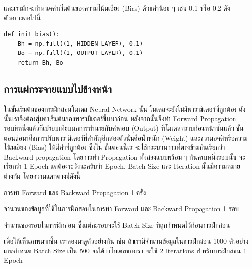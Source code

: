 \noindent และเรามักจะกำหนดค่าเริ่มต้นของความโน้มเอียง (Bias) ด้วยค่าน้อย ๆ เช่น 0.1 หรือ 0.2 ดังตัวอย่างต่อไปนี้

\begin{lstlisting}[style=MyPython]
def init_bias():
    Bh = np.full((1, HIDDEN_LAYER), 0.1)
    Bo = np.full((1, OUTPUT_LAYER), 0.1)
    return Bh, Bo
\end{lstlisting}

\subsection{การแผ่กระจายแบบไปข้างหน้า}
\label{ssec:forward_prop}

ในขั้นเริ่มต้นของการฝึกสอนโมเดล Neural Network นั้น โมเดลจะยังไม่มีพารามิเตอร์ที่ถูกต้อง ดังนั้นเราจึงต้องสุ่มค่าเริ่มต้นของพารามิเตอร์ขึ้นมาก่อน
หลังจากนั้นจึงทำ Forward Propagation รอบที่หนึ่งแล้วก็เปรียบเทียบผลการทำนายกับคำตอบ (Output) ที่โมเดลทราบก่อนหน้านั้นแล้ว
ขั้นตอนต่อมาคือการปรับพารามิเตอร์ที่สำคัญอีกสองตัวนั่นคือน้ำหนัก (Weight) และความอคติหรือความโน้มเอียง (Bias) ให้มีค่าที่ถูกต้อง ซึ่งใน%
ขั้นตอนนี้เราจะใช้กระบวนการที่ตรงข้ามกันเรียกว่า Backward propagation โดยการทำ Propagation ทั้งสองแบบพร้อม ๆ กันครบหนึ่งรอบนั้น%
จะเรียกว่า 1 Epoch แต่ต้องระวังนะครับว่า Epoch, Batch Size และ Iteration นั้นมีความหมายต่างกัน โดยความแตกตางมีดังนี้

\begin{description}[font=$\bullet$~\normalfont\scshape\bfseries\color{red!50!black}]
    \item[1 Epoch] การทำ Forward และ Backward Propagation 1 ครั้ง
    
    \item[Batch Size] จำนวนของข้อมูลที่ใช้ในการฝึกสอนในการทำ Forward และ Backward Propagation 1 รอบ
    
    \item[Iteration] จำนวนของรอบในการฝึกสอน ซึ่งแต่ละรอบจะใช้ Batch Size ที่ถูกกำหนดไว้ก่อนการฝึกสอน
\end{description}

เพื่อให้เห็นภาพมากขึ้น เราลองมาดูตัวอย่างกัน เช่น ถ้าเรามีจำนวนข้อมูลในการฝึกสอน 1000 ตัวอย่างและกำหนด Batch Size เป็น 500 จะได้ว่าโมเดลของเรา%
จะใช้ 2 Iterations สำหรับการฝึกสอน 1 Epoch


